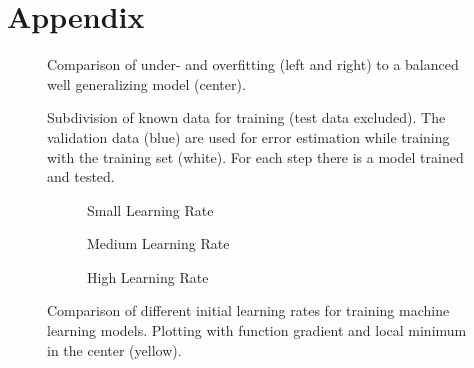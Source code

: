 \chapter{Appendix}

\begin{figure}[hbt]
    \centering
    
    \caption[Under and Overfitting]{Comparison of under- and overfitting (left and right) to a balanced well generalizing model (center). \cite{Thoma.2015}}
    \label{fig:overfitting1}
\end{figure}

\begin{figure}[H]
    \centering
    
    \caption[Cross-validation]{Subdivision of known data for training (test data excluded). The validation data (blue) are used for error estimation while training with the training set (white).  For each step there is a model trained and tested. \cite{Skillmon.2018}}
    \label{fig:crossvalidation}
\end{figure}

\begin{figure}[hbt]
\centering
\begin{subfigure}[b]{0.5\textwidth}
    \centering
    
    \caption[Small Learning Rate]{Small Learning Rate}
    \label{fig:gradientdescent1}
\end{subfigure}
\begin{subfigure}[b]{0.5\textwidth}
    \centering
    
    \caption[Medium Learning Rate]{Medium Learning Rate}
    \label{fig:gradientdescent2}
\end{subfigure}
\begin{subfigure}[b]{0.5\textwidth}
    \centering
    
    \caption[High Learning Rate]{High Learning Rate}
    \label{fig:gradientdescent3}
\end{subfigure}
\caption[Learning Rate Comparison]{Comparison of different initial learning rates for training machine learning models. Plotting with function gradient and local minimum in the center (yellow). \cite{user30471.2020}}
\label{fig:gradientdescent}
\end{figure}